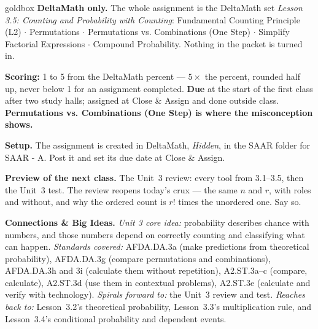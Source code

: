 \documentclass[10pt]{article}
\begin{document}
\boxguard
\begin{skillbox}{goldbox}
\textbf{DeltaMath only.} The whole assignment is the DeltaMath set \emph{Lesson 3.5: Counting
and Probability with Counting}: Fundamental Counting Principle (L2) $\cdot$ Permutations $\cdot$
Permutations vs. Combinations (One Step) $\cdot$ Simplify Factorial Expressions $\cdot$ Compound
Probability. Nothing in the packet is turned in.

\textbf{Scoring:} 1 to 5 from the DeltaMath percent --- $5 \times$ the percent, rounded half
up, never below 1 for an assignment completed. \textbf{Due} at the start of the first class
after two study halls; assigned at Close \& Assign and done outside class.
\textbf{Permutations vs. Combinations (One Step) is where the misconception shows.}

\textbf{Setup.} The assignment is created in DeltaMath, \emph{Hidden}, in the SAAR folder for
SAAR - A. Post it and set its due date at Close \& Assign.

\textbf{Preview of the next class.} The Unit~3 review: every tool from 3.1--3.5, then the
Unit~3 test. The review reopens today's crux --- the same $n$ and $r$, with roles and
without, and why the ordered count is $r!$ times the unordered one. Say so.

\textbf{Connections \& Big Ideas.} \textit{Unit 3 core idea:} probability describes chance with
numbers, and those numbers depend on correctly counting and classifying what can happen.
\textit{Standards covered:} AFDA.DA.3a (make predictions from theoretical probability),
AFDA.DA.3g (compare permutations and combinations), AFDA.DA.3h and 3i (calculate them without
repetition), A2.ST.3a--c (compare, calculate), A2.ST.3d (use them in contextual problems),
A2.ST.3e (calculate and verify with technology). \textit{Spirals forward to:} the Unit~3
review and test. \textit{Reaches back to:} Lesson~3.2's theoretical probability, Lesson~3.3's
multiplication rule, and Lesson~3.4's conditional probability and dependent events.
\end{skillbox}
\end{document}

